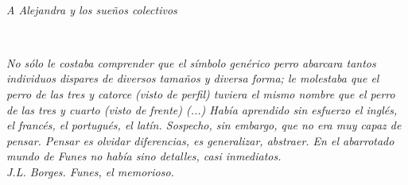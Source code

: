 
\thispagestyle{empty}

\ 

\vspace{3cm}

\begin{flushright}
\textit{A Alejandra y los sueños colectivos}
\end{flushright}

\newpage
\thispagestyle{empty}

\ 

\vspace{3cm}

\begin{flushright}
\textit{No sólo le costaba comprender que el símbolo genérico {\em perro} abarcara tantos individuos dispares de diversos tamaños y diversa forma; le molestaba que el perro de las tres y catorce (visto de perfil) tuviera el mismo nombre que el perro de las tres y cuarto (visto de frente) (...) Había aprendido sin esfuerzo el inglés, el francés, el portugués, el latín. Sospecho, sin embargo, que no era muy capaz de pensar. Pensar es olvidar diferencias, es generalizar, abstraer. En el abarrotado mundo de Funes no había sino detalles, casi inmediatos.
\\
\medskip
{\em J.L. Borges. Funes, el memorioso.~\cite{funes}}
}
\end{flushright}